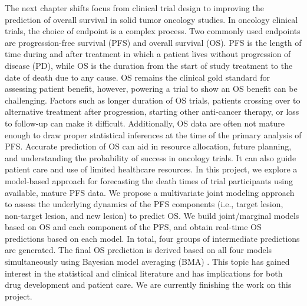 The next chapter shifts focus from clinical trial design to improving the prediction of overall survival in solid tumor oncology studies. In oncology clinical trials, the choice of endpoint is a complex process. Two commonly used endpoints are progression-free survival (PFS) and overall survival (OS). PFS is the length of time during and after treatment in which a patient lives without progression of disease (PD), while OS is the duration from the start of study treatment to the date of death due to any cause. OS remains the clinical gold standard for assessing patient benefit, however, powering a trial to show an OS benefit can be challenging. Factors such as longer duration of OS trials, patients crossing over to alternative treatment after progression, starting other anti-cancer therapy, or loss to follow-up can make it difficult. Additionally, OS data are often not mature enough to draw proper statistical inferences at the time of the primary analysis of PFS. Accurate prediction of OS can aid in resource allocation, future planning, and understanding the probability of success in oncology trials. It can also guide patient care and use of limited healthcare resources. In this project, we explore a model-based approach for forecasting the death times of trial participants using available, mature PFS data. We propose a multivariate joint modeling approach to assess the underlying dynamics of the PFS components (i.e., target lesion, non-target lesion, and new lesion) to predict OS. We build joint/marginal models based on OS and each component of the PFS, and obtain real-time OS predictions based on each model. In total, four groups of intermediate predictions are generated. The final OS prediction is derived based on all four models simultaneously using Bayesian model averaging (BMA) \citep{hoeting1999bayesian}. This topic has gained interest in the statistical and clinical literature and has implications for both drug development and patient care. We are currently finishing the work on this project.

